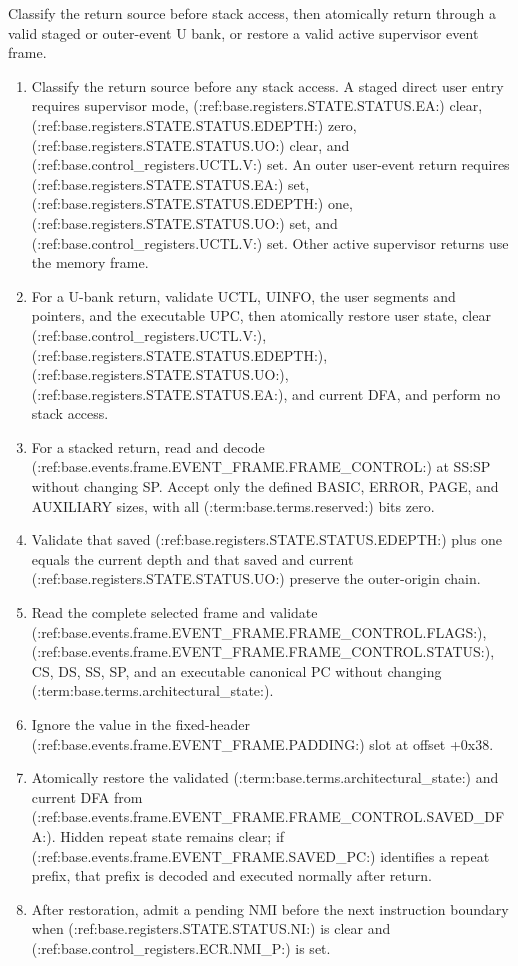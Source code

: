 Classify the return source before stack access, then atomically return through a valid staged or outer-event U bank, or restore a valid active supervisor event frame.

{\raggedright
\begin{enumerate}
\item Classify the return source before any stack access. A staged direct user entry requires supervisor mode, (:ref:base.registers.STATE.STATUS.EA:) clear, (:ref:base.registers.STATE.STATUS.EDEPTH:) zero, (:ref:base.registers.STATE.STATUS.UO:) clear, and (:ref:base.control_registers.UCTL.V:) set. An outer user-event return requires (:ref:base.registers.STATE.STATUS.EA:) set, (:ref:base.registers.STATE.STATUS.EDEPTH:) one, (:ref:base.registers.STATE.STATUS.UO:) set, and (:ref:base.control_registers.UCTL.V:) set. Other active supervisor returns use the memory frame.
\item For a U-bank return, validate UCTL, UINFO, the user segments and pointers, and the executable UPC, then atomically restore user state, clear (:ref:base.control_registers.UCTL.V:), (:ref:base.registers.STATE.STATUS.EDEPTH:), (:ref:base.registers.STATE.STATUS.UO:), (:ref:base.registers.STATE.STATUS.EA:), and current DFA, and perform no stack access.
\item For a stacked return, read and decode (:ref:base.events.frame.EVENT_FRAME.FRAME_CONTROL:) at SS:SP without changing SP. Accept only the
defined BASIC, ERROR, PAGE, and AUXILIARY sizes, with all (:term:base.terms.reserved:) bits zero.
\item Validate that saved (:ref:base.registers.STATE.STATUS.EDEPTH:) plus one equals the current depth and that saved and current (:ref:base.registers.STATE.STATUS.UO:) preserve the outer-origin chain.
\item Read the complete selected frame and validate (:ref:base.events.frame.EVENT_FRAME.FRAME_CONTROL.FLAGS:), (:ref:base.events.frame.EVENT_FRAME.FRAME_CONTROL.STATUS:), CS, DS, SS, SP, and an executable canonical PC without changing (:term:base.terms.architectural_state:).
\item Ignore the value in the fixed-header (:ref:base.events.frame.EVENT_FRAME.PADDING:) slot at offset +0x38.
\item Atomically restore the validated (:term:base.terms.architectural_state:) and current DFA from
(:ref:base.events.frame.EVENT_FRAME.FRAME_CONTROL.SAVED_DFA:). Hidden repeat state remains clear;
if (:ref:base.events.frame.EVENT_FRAME.SAVED_PC:) identifies a repeat prefix, that prefix is decoded and executed normally after return.
\item After restoration, admit a pending NMI before the next instruction boundary when (:ref:base.registers.STATE.STATUS.NI:) is clear and (:ref:base.control_registers.ECR.NMI_P:) is set.
\end{enumerate}
\par}
